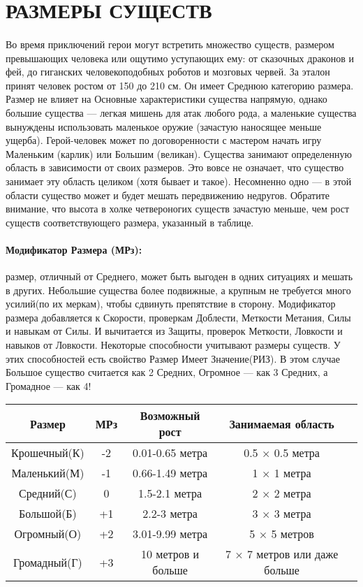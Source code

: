 \section{РАЗМЕРЫ СУЩЕСТВ}
\paragraph{}
Во время приключений герои могут встретить множество существ, размером превышающих человека или ощутимо уступающих ему: от сказочных драконов и фей, до гиганских человекоподобных роботов и мозговых червей. За эталон принят человек ростом от 150 до 210 см. Он имеет Среднюю категорию размера. Размер не влияет на Основные характеристики существа напрямую, однако большие существа — легкая мишень для атак любого рода, а маленькие существа вынуждены использовать маленькое оружие (зачастую наносящее меньше ущерба). Герой-человек может по договоренности с мастером начать игру Маленьким (карлик) или Большим (великан).
\newline
Существа занимают определенную область в зависимости от своих размеров. Это вовсе не означает, что существо занимает эту область целиком (хотя бывает и такое). Несомненно одно — в этой области существо может и будет мешать передвижению недругов. Обратите внимание, что высота в холке четвероногих существ зачастую меньше, чем рост существ соответствующего размера, указанный в таблице.
\paragraph{Модификатор Размера (МРз):} размер, отличный от Среднего, может быть выгоден в одних ситуациях и мешать в других. Небольшие существа более подвижные, а крупным не требуется много усилий(по их меркам), чтобы сдвинуть препятствие в сторону.
\newline
Модификатор размера добавляется к Скорости, проверкам Доблести, Меткости Метания, Силы и навыкам от Силы. И вычитается из Защиты, проверок Меткости, Ловкости и навыков от Ловкости.
\newline
Некоторые способности учитывают размеры существ. У этих способностей есть свойство Размер Имеет Значение(РИЗ). В этом случае Большое существо считается как 2 Средних, Огромное — как 3 Средних, а Громадное — как 4!
\begin{center}
\begin{tabular}{ |c|c|c|c|c| }
\hline
Размер & МРз & Возможный рост & Занимаемая область
\\ \hline
Крошечный(К) & -2 & 0.01-0.65 метра & 0.5 × 0.5 метра
\\ \hline
Маленький(М) & -1 & 0.66-1.49 метра & 1 × 1 метра
\\ \hline
Средний(С) & 0 & 1.5-2.1 метра & 2 × 2 метра
\\ \hline
Большой(Б) & +1 & 2.2-3 метра & 3 × 3 метра
\\ \hline
Огромный(О) & +2 & 3.01-9.99 метра & 5 × 5 метров
\\ \hline
Громадный(Г) & +3 & 10 метров и больше & 7 × 7 метров или даже больше
\\ \hline
\end{tabular}
\end{center}
